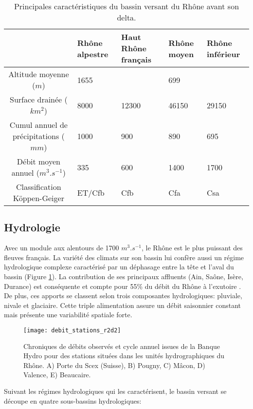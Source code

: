 \begin{table}[h!]
 \caption{Principales caractéristiques du bassin versant du Rhône avant son delta.}
 \label{tab_rhone}
 \begin{tabularx}{\textwidth}{cXXXX}
 \hline
 & Rhône alpestre & Haut Rhône français & Rhône moyen & Rhône inférieur\\
 \hline
  Altitude moyenne ($m$)&1655&&699&\\
  Surface drainée ($km^{2}$)&8000&12300&46150&29150\\
  Cumul annuel de précipitations ($mm$)&1000&900&890&695\\
  Débit moyen annuel ($m^{3}.s^{-1}$)&335&600&1400&1700\\ 
  Classification Köppen-Geiger &ET/Cfb&Cfb&Cfa&Csa\\
  \hline
 \end{tabularx}
\end{table}

\subsection*{Hydrologie}
\label{sec:hydrologie}

Avec un module aux alentours de 1700 $m^{3}.s^{-1}$, le Rhône est le plus puissant des fleuves français. La variété des climats sur son bassin lui confère aussi un régime hydrologique complexe caractérisé par un déphasage entre la tête et l'aval du bassin (Figure \ref{debit_r2d2}). La contribution de ses principaux affluents (Ain, Saône, Isère, Durance) est conséquente et compte pour 55\% du débit du Rhône à l'exutoire \citep{edl2019}. De plus, ces apports se classent selon trois composantes hydrologiques: pluviale, nivale et glaciaire. Cette triple alimentation assure un débit saisonnier constant mais présente une variabilité spatiale forte. \\

\begin{figure}[h!]
\centering
\texttt{[image: debit\_stations\_r2d2]}
\caption{Chroniques de débits observés et cycle annuel issues de la Banque Hydro pour des stations situées dans les unités hydrographiques du Rhône. A) Porte du Scex (Suisse), B) Pougny, C) Mâcon, D) Valence, E) Beaucaire.}
\label{debit_r2d2}
\end{figure}

\noindent Suivant les régimes hydrologiques qui les caractérisent, le bassin versant se découpe en quatre sous-bassins hydrologiques:

